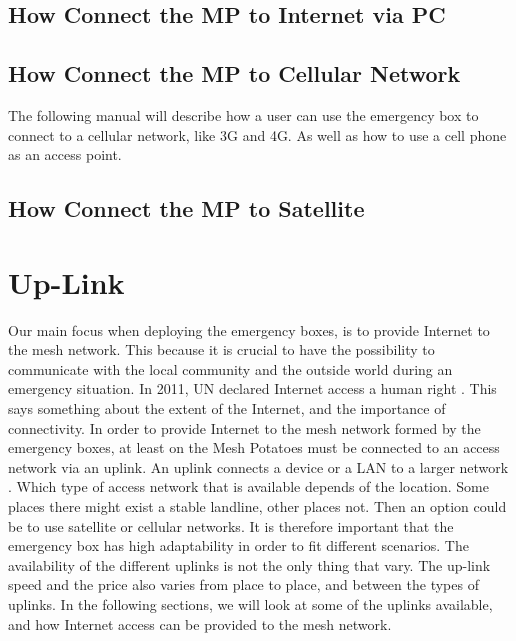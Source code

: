 \subsection{How Connect the MP to Internet via PC}


\subsection{How Connect the MP to Cellular Network}
The following manual will describe how a user can use the emergency box to connect to a cellular network, like 3G and 4G. As well as how to use a cell phone as an access point. 



\subsection{How Connect the MP to Satellite}



\section{Up-Link}
Our main focus when deploying the emergency boxes, is to provide Internet to the mesh network. This because it is crucial to have the possibility to communicate with the local community and the outside world during an emergency situation. In 2011, UN declared Internet access a human right \cite{HR}. This says something about the extent of the Internet, and the importance of connectivity. In order to provide Internet to the mesh network formed by the emergency boxes, at least on the Mesh Potatoes must be connected to an access network via an uplink. An uplink connects a device or a LAN to a larger network \cite{uplink}. Which type of access network that is available depends of the location. Some places there might exist a stable landline, other places not. Then an option could be to use satellite or cellular networks. It is therefore important that the emergency box has high adaptability in order to fit different scenarios. The availability of the different uplinks is not the only thing that vary. The up-link speed and the price also varies from place to place, and between the types of uplinks. In the following sections, we will look at some of the uplinks available, and how Internet access can be provided to the mesh network.  


